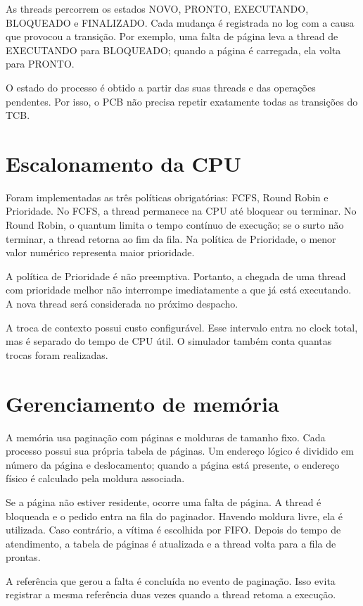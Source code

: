 \documentclass[11pt,a4paper]{article}
\begin{document}
As threads percorrem os estados NOVO, PRONTO, EXECUTANDO, BLOQUEADO e FINALIZADO. Cada mudança é registrada no log com a causa que provocou a transição. Por exemplo, uma falta de página leva a thread de EXECUTANDO para BLOQUEADO; quando a página é carregada, ela volta para PRONTO.

O estado do processo é obtido a partir das suas threads e das operações pendentes. Por isso, o PCB não precisa repetir exatamente todas as transições do TCB.

\section{Escalonamento da CPU}

Foram implementadas as três políticas obrigatórias: FCFS, Round Robin e Prioridade. No FCFS, a thread permanece na CPU até bloquear ou terminar. No Round Robin, o quantum limita o tempo contínuo de execução; se o surto não terminar, a thread retorna ao fim da fila. Na política de Prioridade, o menor valor numérico representa maior prioridade.

A política de Prioridade é não preemptiva. Portanto, a chegada de uma thread com prioridade melhor não interrompe imediatamente a que já está executando. A nova thread será considerada no próximo despacho.

A troca de contexto possui custo configurável. Esse intervalo entra no clock total, mas é separado do tempo de CPU útil. O simulador também conta quantas trocas foram realizadas.

\section{Gerenciamento de memória}

A memória usa paginação com páginas e molduras de tamanho fixo. Cada processo possui sua própria tabela de páginas. Um endereço lógico é dividido em número da página e deslocamento; quando a página está presente, o endereço físico é calculado pela moldura associada.

Se a página não estiver residente, ocorre uma falta de página. A thread é bloqueada e o pedido entra na fila do paginador. Havendo moldura livre, ela é utilizada. Caso contrário, a vítima é escolhida por FIFO. Depois do tempo de atendimento, a tabela de páginas é atualizada e a thread volta para a fila de prontas.

A referência que gerou a falta é concluída no evento de paginação. Isso evita registrar a mesma referência duas vezes quando a thread retoma a execução.
\end{document}
